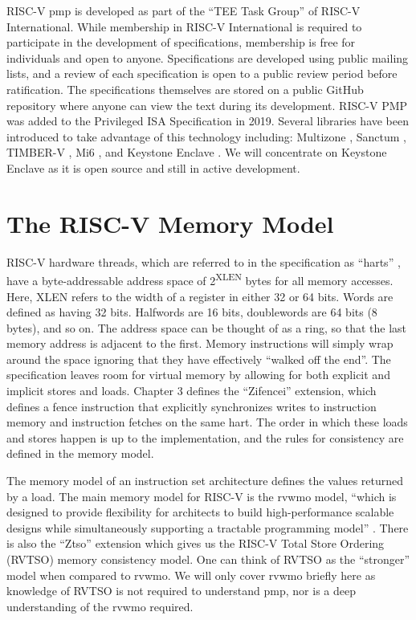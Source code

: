 RISC-V \gls{pmp} is developed as part of the ``TEE Task Group'' of RISC-V International. While membership in RISC-V International is required to participate in the development of specifications, membership is free for individuals and open to anyone. Specifications are developed using public mailing lists, and a review of each specification is open to a public review period before ratification. The specifications themselves are stored on a public GitHub repository where anyone can view the text during its development. RISC-V PMP was added to the Privileged ISA Specification \cite{PrivIsa2019} in 2019. Several libraries have been introduced to take advantage of this technology including: Multizone \cite{pinto2019industry}, Sanctum \cite{Costan2016a}, TIMBER-V \cite{weiser2019timber}, Mi6 \cite{bourgeat2019mi6}, and Keystone Enclave \cite{lee2019keystone, lee2020keystone, cheangverifying}. We will concentrate on Keystone Enclave as it is open source and still in active development.

\section{The RISC-V Memory Model}
RISC-V hardware threads, which are referred to in the specification as ``harts'' \cite{UnprivIsa2019}, have a byte-addressable address space of 2\textsuperscript{XLEN} bytes for all memory accesses. Here, XLEN refers to the width of a register in either 32 or 64 bits. Words are defined as having 32 bits. Halfwords are 16 bits, doublewords are 64 bits (8 bytes), and so on. The address space can be thought of as a ring, so that the last memory address is adjacent to the first. Memory instructions will simply wrap around the space ignoring that they have effectively ``walked off the end''. The specification leaves room for virtual memory by allowing for both explicit and implicit stores and loads. Chapter 3 defines the ``Zifencei'' extension, which defines a fence instruction that explicitly synchronizes writes to instruction memory and instruction fetches on the same \gls{hart}. The order in which these loads and stores happen is up to the implementation, and the rules for consistency are defined in the memory model.

The memory model of an instruction set architecture defines the values returned by a load. The main memory model for RISC-V is the \gls{rvwmo} model, ``which is designed to provide flexibility for architects to build high-performance scalable designs while simultaneously supporting a tractable programming model'' \cite{UnprivIsa2019}. There is also the ``Ztso'' extension which gives us the RISC-V Total Store Ordering (RVTSO) memory consistency model. One can think of RVTSO as the ``stronger'' model when compared to \gls{rvwmo}. We will only cover \gls{rvwmo} briefly here as knowledge of RVTSO is not required to understand \gls{pmp}, nor is a deep understanding of the \gls{rvwmo} required.


